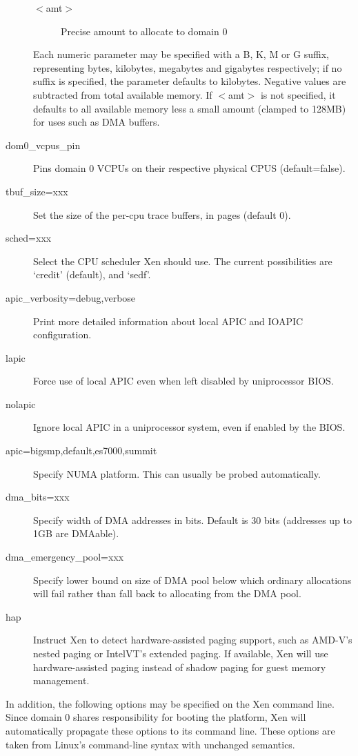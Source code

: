 \documentclass[11pt,twoside,final,openright]{report}
\begin{document}
\begin{description}
\begin{description}
  \item[ $<$amt$>$ ] Precise amount to allocate to domain 0
  \end{description}
  Each numeric parameter may be specified with a B, K, M or
  G suffix, representing bytes, kilobytes, megabytes and gigabytes
  respectively; if no suffix is specified, the parameter defaults to
  kilobytes. Negative values are subtracted from total available
  memory. If $<$amt$>$ is not specified, it defaults to all available
  memory less a small amount (clamped to 128MB) for uses such as DMA
  buffers.
\item [ dom0\_vcpus\_pin ] Pins domain 0 VCPUs on their respective
  physical CPUS (default=false).
\item [ tbuf\_size=xxx ] Set the size of the per-cpu trace buffers, in
  pages (default 0).  
\item [ sched=xxx ] Select the CPU scheduler Xen should use.  The
  current possibilities are `credit' (default), and `sedf'.
\item [ apic\_verbosity=debug,verbose ] Print more detailed
  information about local APIC and IOAPIC configuration.
\item [ lapic ] Force use of local APIC even when left disabled by
  uniprocessor BIOS.
\item [ nolapic ] Ignore local APIC in a uniprocessor system, even if
  enabled by the BIOS.
\item [ apic=bigsmp,default,es7000,summit ] Specify NUMA platform.
  This can usually be probed automatically.
\item [ dma\_bits=xxx ] Specify width of DMA
  addresses in bits. Default is 30 bits (addresses up to 1GB are DMAable).
\item [ dma\_emergency\_pool=xxx ] Specify lower bound on size of DMA
  pool below which ordinary allocations will fail rather than fall
  back to allocating from the DMA pool.
\item [ hap ] Instruct Xen to detect hardware-assisted paging support, such
  as AMD-V's nested paging or Intel\textregistered VT's extended paging. If 
  available, Xen will use hardware-assisted paging instead of shadow paging 
  for guest memory management.
\end{description}

In addition, the following options may be specified on the Xen command
line. Since domain 0 shares responsibility for booting the platform,
Xen will automatically propagate these options to its command line.
These options are taken from Linux's command-line syntax with
unchanged semantics.
\end{document}
